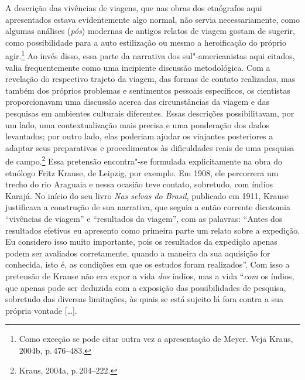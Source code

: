A descrição das vivências de viagens, que nas obras dos etnógrafos aqui
apresentados estava evidentemente algo normal, não servia
necessariamente, como algumas análises (\textit{pós}) modernas de antigos
relatos de viagem gostam de sugerir, como possibilidade para a auto
estilização ou mesmo a heroificação do próprio agir.\footnote{Como
  exceção se pode citar outra vez a apresentação de Meyer. Veja Kraus,
  2004b, p.\,476--483.} Ao invés disso, essa parte da narrativa dos
sul"-americanistas aqui citados, valia frequentemente como uma incipiente
discussão metodológica. Com a revelação do respectivo trajeto da viagem,
das formas de contato realizadas, mas também dos próprios problemas e
sentimentos pessoais específicos, os cientistas proporcionavam uma
discussão acerca das circunstâncias da viagem e das pesquisas em
ambientes culturais diferentes. Essas descrições possibilitavam, por um
lado, uma contextualização mais precisa e uma ponderação dos dados
levantados; por outro lado, elas poderiam ajudar os viajantes
posteriores a adaptar seus preparativos e procedimentos às dificuldades
reais de uma pesquisa de campo.\footnote{Kraus, 2004a, p.\,204--222.} Essa
pretensão encontra"-se formulada explicitamente na obra do etnólogo Fritz
Krause, de Leipzig, por exemplo. Em 1908, ele percorrera um
trecho do rio Araguaia e nessa ocasião teve contato, sobretudo, com
índios Karajá. No início do seu livro \textit{Nas selvas do Brasil}, publicado em 1911, Krause
justificava a construção de sua narrativa, que seguia a então corrente
dicotomia ``vivências de viagem'' e ``resultados da viagem'', com as
palavras: ``Antes dos resultados efetivos eu apresento como primeira
parte um relato sobre a expedição. Eu considero isso muito importante,
pois os resultados da expedição apenas podem ser avaliados corretamente,
quando a maneira da sua aquisição for conhecida, isto é, as condições
em que os estudos foram realizados''. Com isso a pretensão de Krause não
era expor a vida \textit{dos} índios, mas a vida ``\textit{com} os índios,
que apenas pode ser deduzida com a exposição das possibilidades de
pesquisa, sobretudo das diversas limitações, às quais se está sujeito
lá fora contra a sua própria vontade {[}\ldots{}{]}. 

